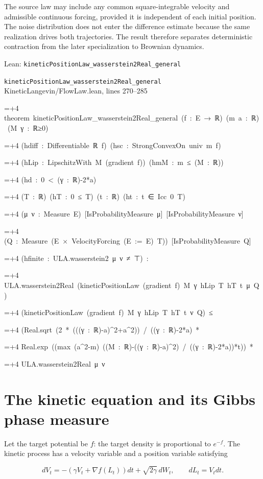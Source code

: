 \documentclass[11pt,a4paper]{article}
\newlength{\leancharwidth}
\newenvironment{leancode}{\par\smallskip\begingroup\ttfamily\footnotesize\raggedright
  \settowidth{\leancharwidth}{M}\setlength{\parskip}{0pt}\setlength{\parindent}{0pt}
  \frenchspacing}{\par\endgroup\smallskip}
\newcommand{\leanline}[2]{\hangindent=\dimexpr#1\leancharwidth+4\leancharwidth\relax
  \hangafter=1\noindent\hspace*{#1\leancharwidth}#2\par}
\newcommand{\leansource}[1]{\par{\footnotesize\color{leanmuted}#1}\par}
\begin{document}
The source law may include any common square-integrable velocity and admissible continuous forcing, provided it is independent of each initial position. The noise distribution does not enter the difference estimate because the same realization drives both trajectories. The result therefore separates deterministic contraction from the later specialization to Brownian dynamics.

\begin{leanbox}{Lean: \texttt{kineticPositionLaw\_\allowbreak{}wasserstein2Real\_\allowbreak{}general}}
\leansource{\texttt{kineticPositionLaw\_\allowbreak{}wasserstein2Real\_\allowbreak{}general} \quad KineticLangevin/\allowbreak{}FlowLaw.lean, lines 270–285}
\begin{leancode}
\leanline{0}{theorem\ kineticPositionLaw\_wasserstein2Real\_general\ (f\ :\ E\ →\ ℝ)\ (m\ a\ :\ ℝ)\ (M\ γ\ :\ ℝ≥0)}
\leanline{4}{(hdiff\ :\ Differentiable\ ℝ\ f)\ (hsc\ :\ StrongConvexOn\ univ\ m\ f)}
\leanline{4}{(hLip\ :\ LipschitzWith\ M\ (gradient\ f))\ (hmM\ :\ m\ ≤\ (M\ :\ ℝ))}
\leanline{4}{(hd\ :\ 0\ <\ (γ\ :\ ℝ)-2*a)}
\leanline{4}{(T\ :\ ℝ)\ (hT\ :\ 0\ ≤\ T)\ (t\ :\ ℝ)\ (ht\ :\ t\ ∈\ Icc\ 0\ T)}
\leanline{4}{(μ\ ν\ :\ Measure\ E)\ [IsProbabilityMeasure\ μ]\ [IsProbabilityMeasure\ ν]}
\leanline{4}{(Q\ :\ Measure\ (E\ ×\ VelocityForcing\ (E\ :=\ E)\ T))\ [IsProbabilityMeasure\ Q]}
\leanline{4}{(hfinite\ :\ ULA.wasserstein2\ μ\ ν\ ≠\ ⊤)\ :}
\leanline{4}{ULA.wasserstein2Real\ (kineticPositionLaw\ (gradient\ f)\ M\ γ\ hLip\ T\ hT\ t\ μ\ Q)}
\leanline{6}{(kineticPositionLaw\ (gradient\ f)\ M\ γ\ hLip\ T\ hT\ t\ ν\ Q)\ ≤}
\leanline{6}{(Real.sqrt\ (2\ *\ (((γ\ :\ ℝ)-a)\textasciicircum{}2+a\textasciicircum{}2))\ /\ ((γ\ :\ ℝ)-2*a)\ *}
\leanline{8}{Real.exp\ ((max\ (a\textasciicircum{}2-m)\ ((M\ :\ ℝ)-((γ\ :\ ℝ)-a)\textasciicircum{}2)\ /\ ((γ\ :\ ℝ)-2*a))*t))\ *}
\leanline{8}{ULA.wasserstein2Real\ μ\ ν}
\end{leancode}
\end{leanbox}

\section{\texorpdfstring{The kinetic equation and its Gibbs phase measure}{The kinetic equation and its Gibbs phase measure}}


Let the target potential be \(f\): the target density is proportional to \(e^{-f}\). The kinetic process has a velocity variable and a position variable satisfying


\[dV_t=-(\gamma V_t+\nabla f(L_t))dt+\sqrt{2\gamma}\,dW_t,
\qquad dL_t=V_tdt.\]
\end{document}
